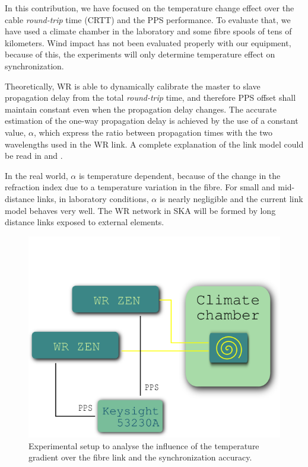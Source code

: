 In this contribution, we have focused on the temperature change effect over the 
cable
\textit{round-trip} time (CRTT) and the PPS performance. To evaluate that, we 
have used a climate chamber in the laboratory and some fibre spools of tens of 
kilometers. Wind impact has not been evaluated properly with our equipment, 
because of this, the experiments will only determine temperature effect on 
synchronization.

Theoretically, WR is able to dynamically calibrate the master to slave 
propagation delay from the total \textit{round-trip} time, and therefore PPS 
offset shall maintain constant even when the propagation delay changes. The 
accurate estimation of the one-way propagation delay is achieved by the use of 
a constant value, $\alpha$, which express the ratio between propagation times 
with the two wavelengths used in the WR link. A complete explanation of the 
link model could be read in \cite{Wlostowski2011} and \cite{Daniluk2012}.

In the real world, $\alpha$ is temperature dependent, because of the change in 
the refraction index due to a temperature variation in the fibre. For small and 
mid-distance links, in laboratory conditions, $\alpha$ is nearly negligible and 
the current link model behaves very well. The WR network in SKA will be formed 
by long distance links exposed to external elements. 


\begin{figure}
	\centering
	\includegraphics[width=0.7\linewidth]{img/tempsetup}
	\caption[Configuration of the climate chamber experiments]{Experimental 
		setup to analyse the influence of the temperature gradient over the 
		fibre link and the synchronization accuracy.}
	\label{fig:tempsetup}
\end{figure}

